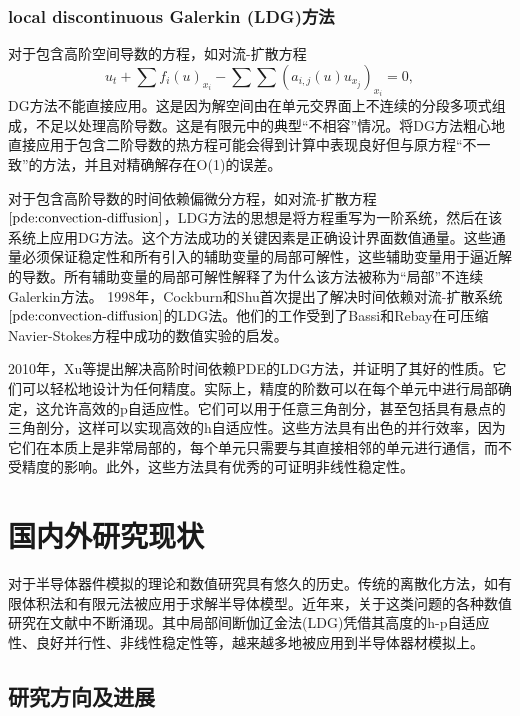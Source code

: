 \subsubsection{local discontinuous Galerkin (LDG)方法}
对于包含高阶空间导数的方程，如对流-扩散方程
\begin{equation}\label{pde:convection-diffusion}
    u_t + \sum f_i(u)_{x_i} - \sum \sum (a_{i,j}(u)u_{x_j})_{x_i} = 0,
\end{equation}
DG方法不能直接应用。这是因为解空间由在单元交界面上不连续的分段多项式组成，不足以处理高阶导数。这是有限元中的典型“不相容”情况。将DG方法粗心地直接应用于包含二阶导数的热方程可能会得到计算中表现良好但与原方程“不一致”的方法，并且对精确解存在O(1)的误差\cite{cockburn2001runge,zhang2003analysis}。

对于包含高阶导数的时间依赖偏微分方程，如对流-扩散方程$\eqref{pde:convection-diffusion}$，LDG方法的思想是将方程重写为一阶系统，然后在该系统上应用DG方法。这个方法成功的关键因素是正确设计界面数值通量。这些通量必须保证稳定性和所有引入的辅助变量的局部可解性，这些辅助变量用于逼近解的导数。所有辅助变量的局部可解性解释了为什么该方法被称为“局部”不连续Galerkin方法\cite{cockburn1998local}。
1998年，Cockburn和Shu首次提出了解决时间依赖对流-扩散系统$\eqref{pde:convection-diffusion}$的LDG法\cite{cockburn1998local}。他们的工作受到了Bassi和Rebay在可压缩Navier-Stokes方程中成功的数值实验的启发\cite{bassi1997high}。

2010年，Xu等提出解决高阶时间依赖PDE的LDG方法\cite{xu2010local}，并证明了其好的性质。它们可以轻松地设计为任何精度。实际上，精度的阶数可以在每个单元中进行局部确定，这允许高效的p自适应性。它们可以用于任意三角剖分，甚至包括具有悬点的三角剖分，这样可以实现高效的h自适应性。这些方法具有出色的并行效率，因为它们在本质上是非常局部的，每个单元只需要与其直接相邻的单元进行通信，而不受精度的影响。此外，这些方法具有优秀的可证明非线性稳定性。

\section{国内外研究现状}
对于半导体器件模拟的理论和数值研究具有悠久的历史。传统的离散化方法，如有限体积法\cite{bank1983numerical,bank1998finite,chainais2003finite,bessemoulin2012finite}和有限元法\cite{brezzi1989two,mauri20153d}被应用于求解半导体模型。近年来，关于这类问题的各种数值研究在文献中不断涌现。其中局部间断伽辽金法(LDG)凭借其高度的h-p自适应性、良好并行性、非线性稳定性等，越来越多地被应用到半导体器材模拟上。
\subsection{研究方向及进展}

